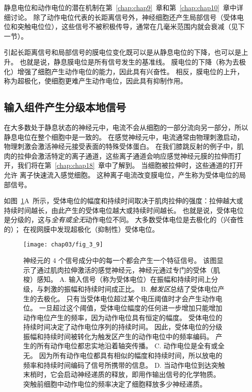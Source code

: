 静息电位和动作电位的潜在机制在第~\ref{chap:chap9}~章和第~\ref{chap:chap10}~章中详细讨论。
除了动作电位代表的长距离信号外，神经细胞还产生局部信号（受体电位和突触电位位），这些信号不被积极传导，通常在几毫米范围内就会衰减（见下一节）。


引起长距离信号和局部信号的膜电位变化既可以是从静息电位的下降，也可以是上升。
也就是说，静息膜电位是所有信号发生的基准线。 
膜电位的下降（称为去极化）增强了细胞产生动作电位的能力，因此具有兴奋性。 
相反，膜电位的上升，称为超极化，使细胞更难产生动作电位，因此具有抑制作用。


\subsection{输入组件产生分级本地信号}
在大多数处于静息状态的神经元中，电流不会从细胞的一部分流向另一部分，所以静息电位在整个细胞中是一致的。 
在感觉神经元中，电流通常由物理刺激启动，物理刺激会激活神经元接受表面的特殊受体蛋白。 
在我们膝跳反射的例子中，肌肉的拉伸会激活特定的离子通道，这些离子通道会响应感觉神经元膜的拉伸而打开，我们将在第~\ref{chap:chap18}~章中了解到。
当细胞被拉伸时，这些通道的打开允许  离子快速流入感觉细胞。 
这种离子电流改变膜电位，产生称为受体电位的局部信号。


如图~\ref{fig:3_9}A~所示，受体电位的幅度和持续时间取决于肌肉拉伸的强度：拉伸越大或持续时间越长，由此产生的受体电位越大或持续时间越长。
也就是说，受体电位是分级的，这与\textit{全有或全无}动作电位不同。
大多数受体电位是去极化的（兴奋性的）；
在视网膜中发现超极化（抑制性）受体电位。


\begin{figure}[htbp]
	\centering
	\texttt{[image: chap03/fig\_3\_9]}
	\caption{神经元的 4 个信号成分中的每一个都会产生一个特征信号。
		该图显示了通过肌肉拉伸激活的感觉神经元，神经元通过专门的受体（肌梭）感知。 
		A. 输入信号（称为受体电位）在振幅和持续时间上分级，与刺激的振幅和持续时间成正比。 
		B. \textit{触发区}总结了受体电位产生的去极化。
		只有当受体电位超过某个电压阈值时才会产生动作电位。
		一旦超过这个阈值，受体电位幅度的任何进一步增加只能增加动作电位产生的频率，因为动作电位具有恒定的幅度。
		受体电位的持续时间决定了动作电位序列的持续时间。
		因此，受体电位的分级振幅和持续时间被转化为触发区产生的动作电位中的频率编码。
		产生的所有动作电位都忠实地沿着轴突传播。
		C. 动作电位是全有或全无。
		因为所有动作电位都具有相似的幅度和持续时间，所以放电的频率和持续时间编码了信号所携带的信息。
		D. 当动作电位到达突触末梢时，它会启动神经递质的释放，即用作输出信号的化学物质。
		突触前细胞中动作电位的频率决定了细胞释放多少神经递质。}
	\label{fig:3_9}
\end{figure}


